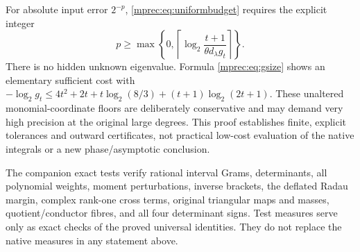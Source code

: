\documentclass[11pt]{article}
\begin{document}
For absolute input error $2^{-p}$, \eqref{mprec:eq:uniformbudget}
requires the explicit integer
\[
 p\ge\max\left\{0,
 \left\lceil\log_2\frac{t+1}{\theta d_\lambda g_t}\right\rceil
 \right\}.
\]
There is no hidden unknown eigenvalue. Formula \eqref{mprec:eq:gsize}
shows an elementary sufficient cost with
$-\log_2g_t\le4t^2+2t+t\log_2(8/3)
 +(t+1)\log_2(2t+1)$.
These unaltered monomial-coordinate floors are deliberately
conservative and may demand very high precision at the original
large degrees. This proof establishes finite, explicit tolerances
and outward certificates, not practical low-cost evaluation of
the native integrals or a new phase/asymptotic conclusion.

The companion exact tests verify rational interval Grams,
determinants, all polynomial weights, moment perturbations, inverse
brackets, the deflated Radau margin, complex rank-one cross terms,
original triangular maps and masses, quotient/conductor fibres,
and all four determinant signs. Test measures serve only as exact
checks of the proved universal identities. They do not replace the
native measures in any statement above.
\end{document}
